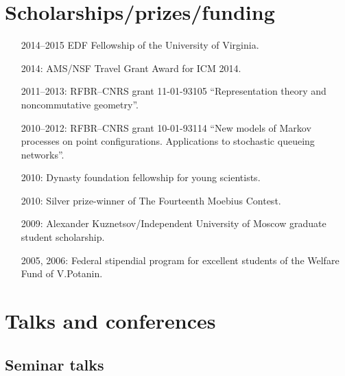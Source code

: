 \documentclass[letterpaper,11pt]{article}
\begin{document}
\section*{Scholarships/prizes/funding}
\begin{itemize}
  \item[2014--2015] EDF Fellowship of the University of Virginia. 

  \item[2014:] AMS/NSF Travel Grant Award for ICM 2014.

  \item[2011--2013:] RFBR--CNRS grant 11-01-93105 ``Representation theory and noncommutative geometry''.
  
  \item[2010--2012:] RFBR--CNRS grant 10-01-93114 ``New models of Markov processes on point configurations. Applications to stochastic queueing networks''.

  \item[2010:] Dynasty foundation fellowship for young scientists.
    
  \item[2010:] Silver prize-winner of The Fourteenth Moebius Contest.

  \item[2009:] Alexander Kuznetsov/Independent University of Moscow graduate student scholarship.

  \item[2005, 2006:] Federal stipendial program for excellent students of the Welfare Fund of V.Potanin.
\end{itemize}

\section*{Talks and conferences}

\subsection*{Seminar talks}
\end{document}
